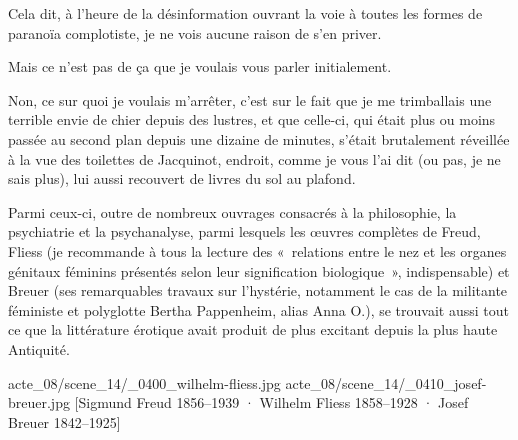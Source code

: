 Cela dit, à l’heure de la désinformation ouvrant la voie à toutes les formes de paranoïa complotiste, je ne vois aucune raison de s’en priver.

Mais ce n’est pas de ça que je voulais vous parler initialement.

Non, ce sur quoi je voulais m’arrêter, c’est sur le fait que je me trimballais une terrible envie de chier depuis des lustres, et que celle-ci, qui était plus ou moins passée au second plan depuis une dizaine de minutes, s’était brutalement réveillée à la vue des toilettes de Jacquinot, endroit, comme je vous l’ai dit (ou pas, je ne sais plus), lui aussi recouvert de livres du sol au plafond.

Parmi ceux-ci, outre de nombreux ouvrages consacrés à la philosophie, la psychiatrie et la psychanalyse, parmi lesquels les œuvres complètes de Freud, Fliess (je recommande à tous la lecture des «~relations entre le nez et les organes génitaux féminins présentés selon leur signification biologique~», indispensable) et Breuer (ses remarquables travaux sur l’hystérie, notamment le cas de la militante féministe et polyglotte Bertha Pappenheim, alias Anna O.), se trouvait aussi tout ce que la littérature érotique avait produit de plus excitant depuis la plus haute Antiquité.

%
%
%
{acte_08/scene_14/_0400_wilhelm-fliess.jpg}
{acte_08/scene_14/_0410_josef-breuer.jpg}
[Sigmund Freud \textup{1856--1939} · Wilhelm Fliess \textup{1858--1928} · Josef Breuer \textup{1842--1925}]


